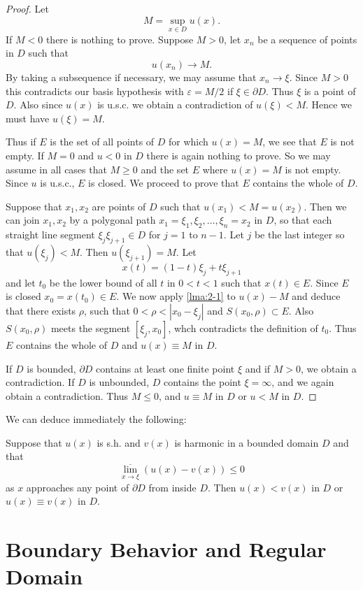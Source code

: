 \begin{proof}
	Let 
	\[
	M=\sup_{x \in D}u(x).
	\] If $M<0$ there is nothing to prove. Suppose $M>0$, let $x_n$ be a sequence of points in $D$ such that 
	\[
	u(x_n)\to M.
	\] By taking a subsequence if necessary, we may assume that $x_n\to \xi$. Since $M>0$ this contradicts our basis hypothesis with $\varepsilon =M /2$ if $\xi \in \partial D$. Thus $\xi$ is a point of $D$. Also since $u(x)$ is u.s.c. we obtain a contradiction of $u(\xi)<M$. Hence we must have $u(\xi)=M$. 

	Thus if  $E$ is the set of all points of $D$ for which $u(x)=M$, we see that $E$ is not empty. If $M=0$ and $u<0$ in $D$ there is again nothing to prove. So we may assume in all cases that $M\ge 0$ and the set $E$ where $u(x)=M$ is not empty. Since $u$ is u.s.c., $E$ is closed. We proceed to prove that $E$ contains the whole of $D$.

	Suppose that $x_1,x_2$ are points of $D$ such that $u(x_1)<M=u(x_2)$. Then we can join $x_1,x_2$ by a polygonal path $x_1=\xi_1,\xi_2,\ldots,\xi_n=x_2$ in $D$, so that each straight line segment $\xi_j\xi_{j+1}\in D$ for $j=1$ to $n-1$. Let $j$ be the last integer so that $u\left( \xi_j \right) <M$. Then $u(\xi_{j+1})=M$. Let 
	\[
	x(t)=(1-t)\xi_j+t\xi_{j+1}
\] and let $t_0$ be the lower bound of all $t$ in $0<t<1$ such that $x(t)\in E$. Since $E$ is closed $x_0=x(t_0)\in E$. We now apply \cref{lma:2-1} to $u(x)-M$ and deduce that there exists $\rho$, such that $0<\rho<|x_0-\xi_j|$ and $S(x_0,\rho)\subset E$. Also $S(x_0,\rho)$ meets the segment $[\xi_j,x_0]$, whch contradicts the definition of $t_0$. Thus $E$ contains the whole of $D$ and $u(x)\equiv M$ in $D$.

If $D$ is bounded, $\partial D$ contains at least one finite point $\xi$ and if $M>0$, we obtain a contradiction. If $D$ is unbounded, $D$ contains the point $\xi=\infty$, and we again obtain a contradiction. Thus $M\le 0$, and $u\equiv M$ in $D$ or $u<M$ in $D$.
\end{proof}
We can deduce immediately the following:
\begin{theorem}
	Suppose that $u(x)$ is s.h. and $v(x)$ is harmonic in a bounded domain $D$ and that 
	\[
	 \overline{\lim_{x\to\xi}}\left( u(x)-v(x) \right) \le 0
	\] as $x$ approaches any point of $\partial D$ from inside $D$. Then $u(x)<v(x)$ in $D$ or $u(x)\equiv v(x)$ in $D$.
\end{theorem}
	

\section{Boundary Behavior and Regular Domain}

